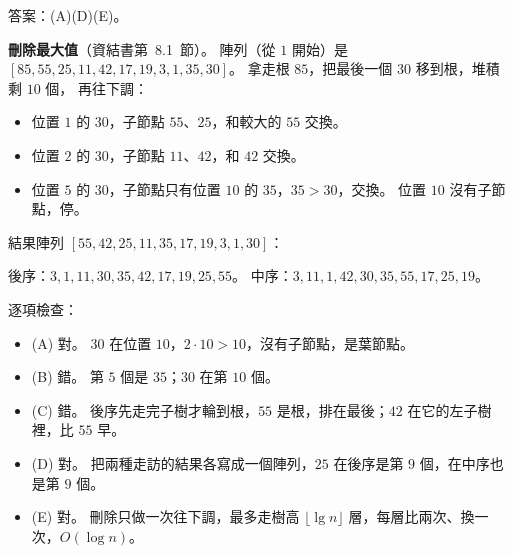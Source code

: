 \begin{pastsoln}
答案：(A)(D)(E)。

\textbf{刪除最大值}（資結書第~8.1~節）。 陣列（從 $1$ 開始）是
$[85, 55, 25, 11, 42, 17, 19, 3, 1, 35, 30]$。 拿走根 $85$，把最後一個 $30$ 移到根，堆積剩 $10$ 個，
再往下調：
\begin{itemize}
\item 位置 $1$ 的 $30$，子節點 $55$、$25$，和較大的 $55$ 交換。
\item 位置 $2$ 的 $30$，子節點 $11$、$42$，和 $42$ 交換。
\item 位置 $5$ 的 $30$，子節點只有位置 $10$ 的 $35$，$35 > 30$，交換。 位置 $10$ 沒有子節點，停。
\end{itemize}
結果陣列 $[55, 42, 25, 11, 35, 17, 19, 3, 1, 30]$：
\begin{center}
\end{center}
後序：$3, 1, 11, 30, 35, 42, 17, 19, 25, 55$。 中序：$3, 11, 1, 42, 30, 35, 55, 17, 25, 19$。

逐項檢查：
\begin{itemize}
\item (A) 對。 $30$ 在位置 $10$，$2 \cdot 10 > 10$，沒有子節點，是葉節點。
\item (B) 錯。 第 $5$ 個是 $35$；$30$ 在第 $10$ 個。
\item (C) 錯。 後序先走完子樹才輪到根，$55$ 是根，排在最後；$42$ 在它的左子樹裡，比 $55$ 早。
\item (D) 對。 把兩種走訪的結果各寫成一個陣列，$25$ 在後序是第 $9$ 個，在中序也是第 $9$ 個。
\item (E) 對。 刪除只做一次往下調，最多走樹高 $\lfloor \lg n \rfloor$ 層，每層比兩次、換一次，$O(\log n)$。
\end{itemize}
\end{pastsoln}
